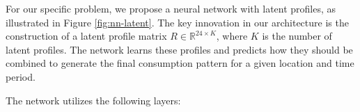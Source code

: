 For our specific problem, we propose a neural network with latent profiles, as illustrated in Figure \ref{fig:nn-latent}. The key innovation in our architecture is the construction of a latent profile matrix $R \in \mathbb{R}^{24 \times K}$, where $K$ is the number of latent profiles. The network learns these profiles and predicts how they should be combined to generate the final consumption pattern for a given location and time period.

\newpage

The network utilizes the following layers:

\newcommand{\nnmodule}[3]{%
    \begin{marginfigure}[1cm]
        \centering
        \texttt{[image: \#2]}
    \end{marginfigure}
    \item \textbf{#1} \\
    #3
    \vspace{2mm}
}


